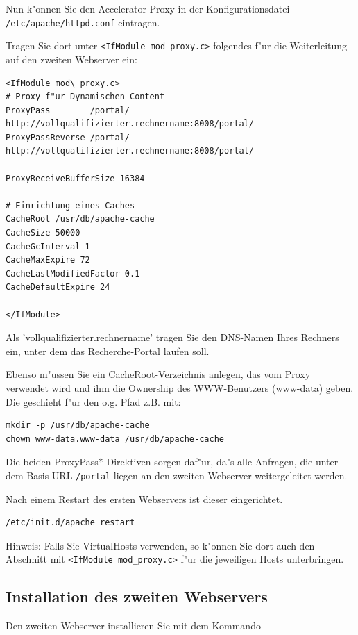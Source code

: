 \documentclass[11pt, twoside, a4paper, BCOR8mm, DIV12, bibtotoc,idxtotoc]{scrbook}
\begin{document}
Nun k"onnen Sie den Accelerator-Proxy in der Konfigurationsdatei
\texttt{/etc/apache/httpd.conf} eintragen.

Tragen Sie dort unter \texttt{<IfModule mod\_proxy.c>} folgendes f"ur die
Weiterleitung auf den zweiten Webserver ein:

\begin{verbatim}
<IfModule mod\_proxy.c>
# Proxy f"ur Dynamischen Content
ProxyPass        /portal/ http://vollqualifizierter.rechnername:8008/portal/
ProxyPassReverse /portal/ http://vollqualifizierter.rechnername:8008/portal/

ProxyReceiveBufferSize 16384

# Einrichtung eines Caches
CacheRoot /usr/db/apache-cache
CacheSize 50000
CacheGcInterval 1
CacheMaxExpire 72
CacheLastModifiedFactor 0.1
CacheDefaultExpire 24

</IfModule>
\end{verbatim}

Als 'vollqualifizierter.rechnername' tragen Sie den DNS-Namen Ihres
Rechners ein, unter dem das Recherche-Portal laufen soll.

Ebenso m"ussen Sie ein CacheRoot-Verzeichnis anlegen, das vom Proxy
verwendet wird und ihm die Ownership des WWW-Benutzers (www-data)
geben. Die geschieht f"ur den o.g. Pfad z.B. mit:

\begin{verbatim}
mkdir -p /usr/db/apache-cache
chown www-data.www-data /usr/db/apache-cache
\end{verbatim}

Die beiden ProxyPass*-Direktiven sorgen daf"ur, da"s alle Anfragen,
die unter dem Basis-URL \texttt{/portal} liegen an den zweiten Webserver
weitergeleitet werden.

Nach einem Restart des ersten Webservers ist dieser eingerichtet.

\begin{verbatim}
/etc/init.d/apache restart
\end{verbatim}


Hinweis: Falls Sie VirtualHosts verwenden, so k"onnen Sie dort auch
den Abschnitt mit \texttt{<IfModule mod\_proxy.c>} f"ur die jeweiligen Hosts
unterbringen.


\subsection{Installation des zweiten Webservers}

Den zweiten Webserver installieren Sie mit dem Kommando
\end{document}
